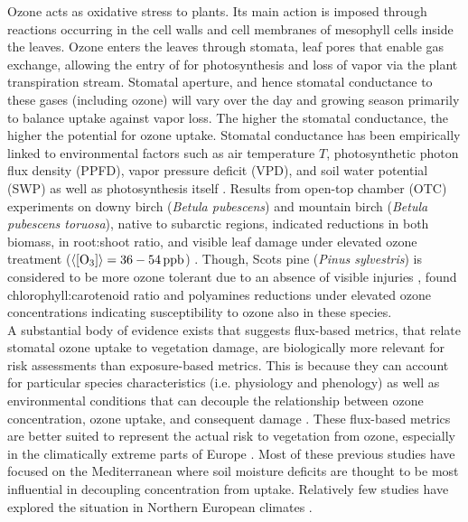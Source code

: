 \documentclass[bg, manuscript]{copernicus}
\begin{document}
Ozone acts as oxidative stress to plants. Its main action is imposed through reactions occurring in the cell walls and cell membranes of mesophyll cells inside the leaves. Ozone enters the leaves through stomata, leaf pores that enable gas exchange, allowing the entry of  for photosynthesis and loss of  vapor via the plant transpiration stream. Stomatal aperture, and hence stomatal conductance to these gases (including ozone) will vary over the day and growing season primarily to balance  uptake against  vapor loss. The higher the stomatal conductance, the higher the potential for ozone uptake. Stomatal conductance has been empirically linked to environmental factors such as air temperature $T$, photosynthetic photon flux density (PPFD), vapor pressure deficit (VPD), and soil water potential (SWP) as well as photosynthesis itself \cite[e.g.]{PTRS:Jarvis1976, BallBerry1987, Emberson2000, ICP:MappingManual2017}. Results from open-top chamber (OTC) experiments on downy birch (\emph{Betula pubescens}) and mountain birch (\emph{Betula pubescens toruosa}), native to subarctic regions, indicated reductions in both biomass, in root:shoot ratio, and visible leaf damage under elevated ozone treatment ($\left<\chem{[O_3]}\right> = 36-54\,\unit{ppb}$) \citep{Amb:Manninen2009}. Though, Scots pine (\emph{Pinus sylvestris}) is considered to be more ozone tolerant due to an absence of visible injuries \citep{Amb:Girgzdiene2009}, \citet{Amb:Manninen2009} found chlorophyll:carotenoid ratio and polyamines reductions under elevated ozone concentrations indicating susceptibility to ozone also in these species.\\

A substantial body of evidence exists that suggests flux-based metrics, that relate stomatal ozone uptake to vegetation damage, are biologically more relevant for risk assessments than exposure-based metrics. This is because they can account for particular species characteristics (i.e. physiology and phenology) as well as environmental conditions that can decouple the relationship between ozone concentration, ozone uptake, and consequent damage \citep{PT:Emberson2020}. These flux-based metrics are better suited to represent the actual risk to vegetation from ozone, especially in the climatically extreme parts of Europe \citep{EP:Simpson2007,GCB:Mills2011,ICP:MappingManual2017}. Most of these previous studies have focused on the Mediterranean where soil moisture deficits are thought to be most influential in decoupling concentration from uptake. Relatively few studies have explored the situation in Northern European climates \citep[e.g.][]{iF:Juran2018}.
\end{document}
